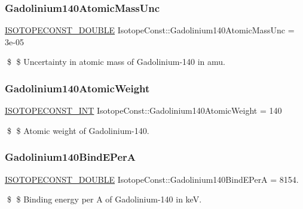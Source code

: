 \subsubsection{\texorpdfstring{Gadolinium140\+Atomic\+Mass\+Unc}{Gadolinium140AtomicMassUnc}}
{\footnotesize\ttfamily \mbox{\hyperlink{group___isotope_const-_macros_ga8f45a7272ce02c0b4c65c44636ed719a}{I\+S\+O\+T\+O\+P\+E\+C\+O\+N\+S\+T\+\_\+\+D\+O\+U\+B\+LE}} Isotope\+Const\+::\+Gadolinium140\+Atomic\+Mass\+Unc = 3e-\/05}

\$ \$ Uncertainty in atomic mass of Gadolinium-\/140 in amu. \mbox{\label{group___isotope_const-_gadolinium-_gd140_ga3976474e3f8e8f01debf6419e531f523}} 
\subsubsection{\texorpdfstring{Gadolinium140\+Atomic\+Weight}{Gadolinium140AtomicWeight}}
{\footnotesize\ttfamily \mbox{\hyperlink{group___isotope_const-_macros_ga5f18360b3e99483a35c32d789e62621c}{I\+S\+O\+T\+O\+P\+E\+C\+O\+N\+S\+T\+\_\+\+I\+NT}} Isotope\+Const\+::\+Gadolinium140\+Atomic\+Weight = 140}

\$ \$ Atomic weight of Gadolinium-\/140. \mbox{\label{group___isotope_const-_gadolinium-_gd140_ga5974c9f9f18b427f592b447260d21c7e}} 
\subsubsection{\texorpdfstring{Gadolinium140\+Bind\+E\+PerA}{Gadolinium140BindEPerA}}
{\footnotesize\ttfamily \mbox{\hyperlink{group___isotope_const-_macros_ga8f45a7272ce02c0b4c65c44636ed719a}{I\+S\+O\+T\+O\+P\+E\+C\+O\+N\+S\+T\+\_\+\+D\+O\+U\+B\+LE}} Isotope\+Const\+::\+Gadolinium140\+Bind\+E\+PerA = 8154.}

\$ \$ Binding energy per A of Gadolinium-\/140 in keV. \mbox{\label{group___isotope_const-_gadolinium-_gd140_gaa08b626885f4e329e7d1098012d454da}} 
